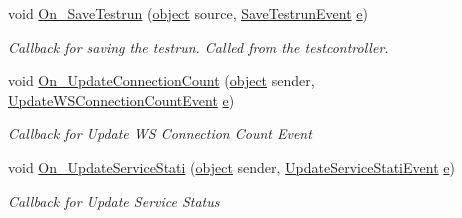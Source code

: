 \begin{DoxyCompactItemize}
void \hyperlink{class_web_analyzer_1_1_controller_1_1_main_controller_aa00702c9b2f489d0db4a676f08e176aa}{On\+\_\+\+Save\+Testrun} (\hyperlink{_u_i_2_h_t_m_l_resources_2js_2lib_2underscore_8min_8js_aae18b7515bb2bc4137586506e7c0c903}{object} source, \hyperlink{class_web_analyzer_1_1_events_1_1_save_testrun_event}{Save\+Testrun\+Event} \hyperlink{_u_i_2_h_t_m_l_resources_2js_2lib_2bootstrap_8min_8js_ab5902775854a8b8440bcd25e0fe1c120}{e})
\begin{DoxyCompactList}\small\item\em Callback for saving the testrun. Called from the testcontroller. \end{DoxyCompactList}\item 
void \hyperlink{class_web_analyzer_1_1_controller_1_1_main_controller_aa5f17af11b8604a5bb8d78d3f7ec5d7a}{On\+\_\+\+Update\+Connection\+Count} (\hyperlink{_u_i_2_h_t_m_l_resources_2js_2lib_2underscore_8min_8js_aae18b7515bb2bc4137586506e7c0c903}{object} sender, \hyperlink{class_web_analyzer_1_1_events_1_1_update_w_s_connection_count_event}{Update\+W\+S\+Connection\+Count\+Event} \hyperlink{_u_i_2_h_t_m_l_resources_2js_2lib_2bootstrap_8min_8js_ab5902775854a8b8440bcd25e0fe1c120}{e})
\begin{DoxyCompactList}\small\item\em Callback for Update W\+S Connection Count Event \end{DoxyCompactList}\item 
void \hyperlink{class_web_analyzer_1_1_controller_1_1_main_controller_a6c6a8a0a61003fb31ac7f1a64813d4cc}{On\+\_\+\+Update\+Service\+Stati} (\hyperlink{_u_i_2_h_t_m_l_resources_2js_2lib_2underscore_8min_8js_aae18b7515bb2bc4137586506e7c0c903}{object} sender, \hyperlink{class_web_analyzer_1_1_events_1_1_update_service_stati_event}{Update\+Service\+Stati\+Event} \hyperlink{_u_i_2_h_t_m_l_resources_2js_2lib_2bootstrap_8min_8js_ab5902775854a8b8440bcd25e0fe1c120}{e})
\begin{DoxyCompactList}\small\item\em Callback for Update Service Status \end{DoxyCompactList}\end{DoxyCompactItemize}
